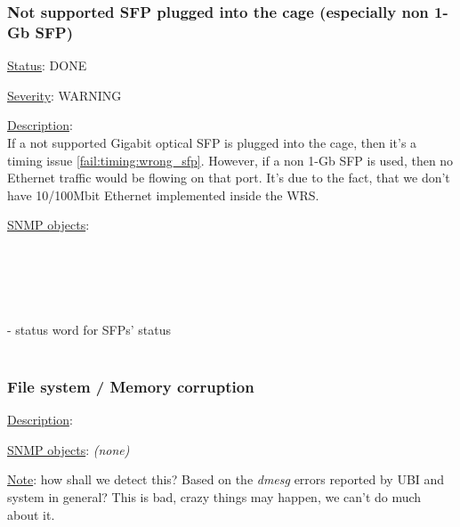 \subsubsection{\bf Not supported SFP plugged into the cage (especially non 1-Gb SFP)}
		\label{fail:other:sfp}
		\begin{pck_descr}
			\item [] \underline{Status}: DONE
			\item [] \underline{Severity}: WARNING
			\item [] \underline{Description}:\\
				If a not supported Gigabit optical SFP is plugged into the cage, then
				it's a timing issue \ref{fail:timing:wrong_sfp}. However, if a non 1-Gb
				SFP is used, then no Ethernet traffic would be flowing on that port.
				It's due to the fact, that we don't have 10/100Mbit Ethernet implemented
				inside the WRS.
			\item [] \underline{SNMP objects}:\\
				\\
				\\
				\\
				\\
				\\
				 - status word for SFPs' status\\
				\\
		\end{pck_descr}

\subsubsection{\bf File system / Memory corruption}
		\label{fail:other:memory}
		\begin{pck_descr}
			\item [] \underline{Description}:\\
			\item [] \underline{SNMP objects}: \emph{(none)}
			\item [] \underline{Note}: how shall we detect this? Based on the
				\emph{dmesg} errors reported by UBI and system in general?  This is bad,
				crazy things may happen, we can't do much about it.
		\end{pck_descr}

